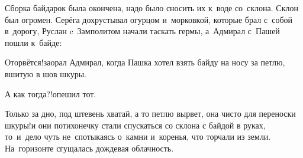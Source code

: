 Сборка байдарок была окончена, надо было сносить их к~воде со~склона. Склон был огромен. Серёга дохрустывал огурцом и~морковкой, которые брал с~собой в~дорогу, Руслан c~Замполитом начали таскать гермы, а~Адмирал с~Пашей пошли к~байде:

 Оторвётся!\mdash заорал Адмирал, когда Пашка хотел взять байду на носу за петлю, вшитую в шов шкуры.

\diagdash А как тогда?!\mdash опешил тот.

\diagdash Только за дно, под штевень хватай, а то петлю вырвет, она чисто для переноски шкуры!\mdash и они потихонечку стали спускаться со склона с байдой в руках, то~и~дело чуть не~спотыкаясь о~камни и~коренья, что торчали из земли. На~горизонте сгущалась дождевая облачность.

\begin{center}
\end{center}
